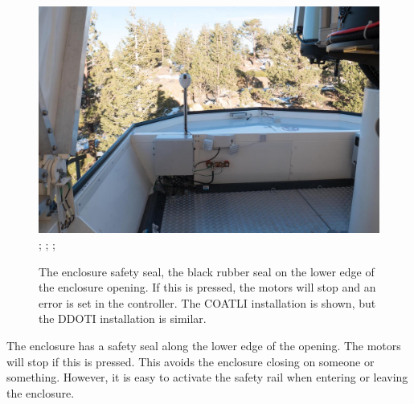 \begin{figure}
\begin{center}
\begin{labeled}{\includegraphics[width=0.8\linewidth]{figures/enclosure-safety-seal.jpg}}
;
;
;
\end{labeled}
\end{center}
\caption{The enclosure safety seal, the black rubber seal on the lower edge of the enclosure opening. If this is pressed, the motors will stop and an error is set in the controller.
\ifddoti
The COATLI installation is shown, but the DDOTI installation is similar.
\fi
}
\label{figure:enclosure-safety-seal}
\end{figure}

The enclosure has a safety seal along the lower edge of the opening. The motors will stop if this is pressed. This avoids the enclosure closing on someone or something. However, it is easy to activate the safety rail when entering or leaving the enclosure. 

